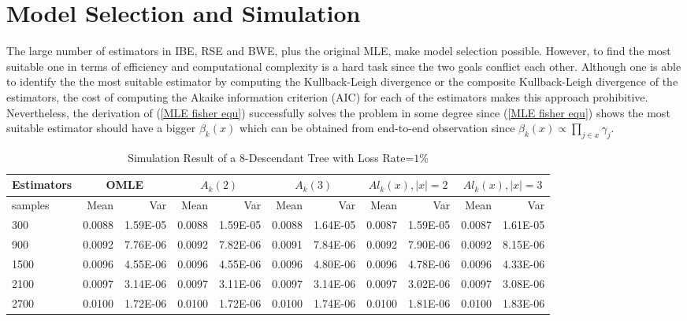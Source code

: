 \documentclass[10pt,onecolumn]{IEEEtran}
\begin{document}
\section{Model Selection and Simulation} \label{section 6}
The large number of estimators in IBE, RSE and BWE, plus the original MLE, make model selection possible. However, to find the most suitable one in terms of efficiency and computational complexity is a hard task since the two goals conflict each other. Although one is able to identify the the most suitable estimator by computing the Kullback-Leigh divergence or the composite Kullback-Leigh divergence of the estimators, the cost of computing the Akaike information criterion (AIC) for each of the estimators makes this approach prohibitive.  Nevertheless, the derivation of (\ref{MLE fisher equ}) successfully solves the problem in some degree since (\ref{MLE fisher equ}) shows the most suitable estimator should have a bigger $\beta_k(x)$ which can be obtained from end-to-end observation since $\beta_k(x)  \propto \prod_{j \in x} \gamma_j$.

\begin{table*}[th]
  \centering
  \scriptsize
  \begin{tabular}{|l|r|r|r|r|r|r|r|r|r|r|}  \hline
 Estimators &\multicolumn{2}{|c|}{OMLE} & \multicolumn{2}{|c|}{$A_k(2)$} & \multicolumn{2}{|c|}{$A_k(3)$} &\multicolumn{2}{|c|}{$Al_k(x), |x|=2$} & \multicolumn{2}{|c|}{$Al_k(x), |x|=3$}	\\ \hline
samples & Mean & Var &	Mean & Var &	Mean & Var	& Mean & Var &  Mean &	Var	\\ \hline
300&	0.0088&	1.59E-05&	0.0088&	1.59E-05&	0.0088&	1.64E-05&	0.0087&	 1.59E-05&	0.0087&	1.61E-05 \\ \hline
900&	0.0092&	7.76E-06&	0.0092&	7.82E-06&	0.0091&	7.84E-06&	0.0092&	 7.90E-06&	0.0092&	8.15E-06 \\ \hline
1500&	0.0096&	4.55E-06&	0.0096&	4.55E-06&	0.0096&	4.80E-06&	0.0096&	 4.78E-06&	0.0096&	4.33E-06 \\ \hline
2100&	0.0097&	3.14E-06&	0.0097&	3.11E-06&	0.0097&	3.14E-06&	0.0097&	 3.02E-06&	0.0097&	3.08E-06 \\ \hline
2700&	0.0100&	1.72E-06&	0.0100&	1.72E-06&	0.0100&	1.74E-06&	0.0100&	 1.81E-06&	0.0100&	1.83E-06 \\ \hline
\end{tabular}
  \caption{Simulation Result of a 8-Descendant Tree with Loss Rate=$1\%$}
  \label{Tab2}
\end{table*}
\end{document}
